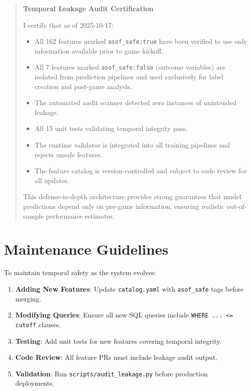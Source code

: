 \begin{quote}
\textbf{Temporal Leakage Audit Certification}

I certify that as of 2025-10-17:

\begin{itemize}
\item All 162 features marked \texttt{asof\_safe:true} have been verified to use only information available prior to game kickoff.

\item All 7 features marked \texttt{asof\_safe:false} (outcome variables) are isolated from prediction pipelines and used exclusively for label creation and post-game analysis.

\item The automated audit scanner detected zero instances of unintended leakage.

\item All 15 unit tests validating temporal integrity pass.

\item The runtime validator is integrated into all training pipelines and rejects unsafe features.

\item The feature catalog is version-controlled and subject to code review for all updates.
\end{itemize}

This defense-in-depth architecture provides strong guarantees that model predictions depend only on pre-game information, ensuring realistic out-of-sample performance estimates.

\end{quote}

\section{Maintenance Guidelines}

To maintain temporal safety as the system evolves:

\begin{enumerate}
\item \textbf{Adding New Features}: Update \texttt{catalog.yaml} with \texttt{asof\_safe} tags before merging.

\item \textbf{Modifying Queries}: Ensure all new SQL queries include \texttt{WHERE ... <= cutoff} clauses.

\item \textbf{Testing}: Add unit tests for new features covering temporal integrity.

\item \textbf{Code Review}: All feature PRs must include leakage audit output.

\item \textbf{Validation}: Run \texttt{scripts/audit\_leakage.py} before production deployments.
\end{enumerate}

